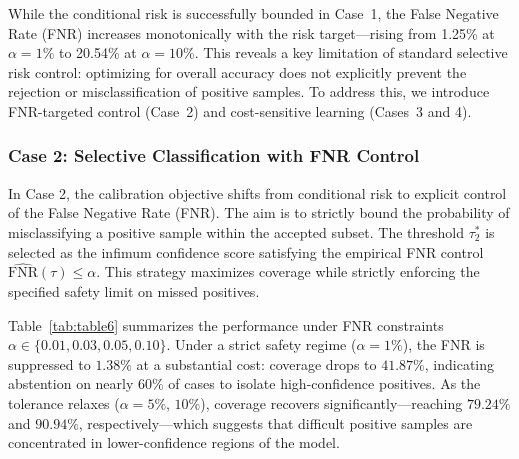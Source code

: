 \documentclass[journal,twoside,web]{ieeecolor}
\begin{document}
While the conditional risk is successfully bounded in Case~1, the False Negative Rate (FNR) increases monotonically with the risk target—rising from 1.25\% at $\alpha=1\%$ to 20.54\% at $\alpha=10\%$. This reveals a key limitation of standard selective risk control: optimizing for overall accuracy does not explicitly prevent the rejection or misclassification of positive samples. To address this, we introduce FNR-targeted control (Case~2) and cost-sensitive learning (Cases~3 and 4).

\subsubsection{\textbf{Case 2: Selective Classification with FNR Control}}
\label{sec:case2_results}

In Case 2, the calibration objective shifts from conditional risk to explicit control of the False Negative Rate (FNR). The aim is to strictly bound the probability of misclassifying a positive sample within the accepted subset. The threshold $\tau_2^*$ is selected as the infimum confidence score satisfying the empirical FNR control $\widehat{\mathrm{FNR}}(\tau) \le \alpha$. This strategy maximizes coverage while strictly enforcing the specified safety limit on missed positives.

\begin{table}[htbp]
    \centering
    \caption{The selective classification performance of Case 2.}
    \label{tab:table6}
\end{table}

Table~\ref{tab:table6} summarizes the performance under FNR constraints $\alpha \in \{0.01, 0.03, 0.05, 0.10\}$. Under a strict safety regime ($\alpha=1\%$), the FNR is suppressed to $1.38\%$ at a substantial cost: coverage drops to $41.87\%$, indicating abstention on nearly $60\%$ of cases to isolate high-confidence positives. As the tolerance relaxes ($\alpha=5\%$, $10\%$), coverage recovers significantly—reaching $79.24\%$ and $90.94\%$, respectively—which suggests that difficult positive samples are concentrated in lower-confidence regions of the model.
\end{document}
